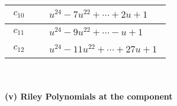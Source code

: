 \documentclass[1p]{elsarticle_modified}
\theoremstyle{definition}
\begin{document}
\begin{tabular}{m{50pt}|m{274pt}}
\hline $$\begin{aligned}c_{10}\end{aligned}$$&$\begin{aligned}
&u^{24}-7 u^{22}+\cdots+2 u+1
\end{aligned}$\\
\hline $$\begin{aligned}c_{11}\end{aligned}$$&$\begin{aligned}
&u^{24}-9 u^{22}+\cdots- u+1
\end{aligned}$\\
\hline $$\begin{aligned}c_{12}\end{aligned}$$&$\begin{aligned}
&u^{24}-11 u^{22}+\cdots+27 u+1
\end{aligned}$\\
\hline
\end{tabular}\\~\\
\newpage\renewcommand{\arraystretch}{1}
\flushleft \textbf{(v) Riley Polynomials at the component}\newline \\
\end{document}

